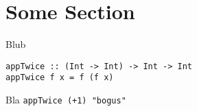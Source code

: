 \documentclass[12pt]{article}
\begin{document}

\tableofcontents

\newpage
{}

\section{Some Section}
Blub
\begin{verbatim}
appTwice :: (Int -> Int) -> Int -> Int
appTwice f x = f (f x)
\end{verbatim}
Bla \texttt{appTwice (+1) "bogus"}

\newpage


\end{document}
